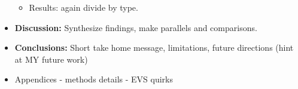 \begin{itemize}
\begin{itemize}
\begin{itemize}
	\end{itemize}

	\item Results: again divide by type.

  \end{itemize}

 \item \textbf{Discussion:}
	Synthesize findings, make parallels and comparisons.

\item \textbf{Conclusions:}
	 Short take home message, limitations, future directions (hint at MY future work)

 \item Appendices
 - methods details
 - EVS quirks
\end{itemize}


